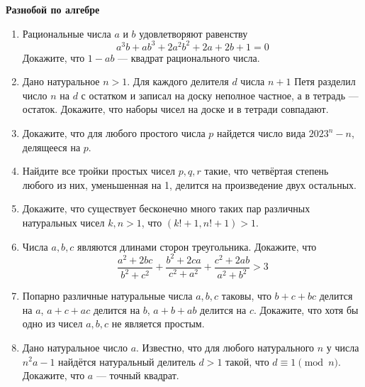 \documentclass{article}
\begin{document}
    \large

    \begin{center}
        \textbf{Разнобой по алгебре}
    \end{center}

    \begin{enumerate}[label*=\protect\fbox{\arabic{enumi}}]

        \item  Рациональные числа $a$ и $b$ удовлетворяют равенству
        \[a^{3}b + ab^3 + 2a^{2}b^2+2a+2b+1 = 0\]
        Докажите, что $1 - ab$ — квадрат рационального числа.

        \item Дано натуральное $n > 1$.
        Для каждого делителя $d$ числа $n + 1$ Петя разделил число $n$ на $d$ с остатком и записал на доску неполное частное, а в тетрадь — остаток.
        Докажите, что наборы чисел на доске и в тетради совпадают.

        \item Докажите, что для любого простого числа $p$ найдется число вида $2023^n - n$,
        делящееся на $p$.

        \item Найдите все тройки простых чисел $p, q, r$ такие, что четвёртая степень любого из них, уменьшенная на 1, делится на произведение двух остальных.

        \item Докажите, что существует бесконечно много таких пар различных натуральных чисел $k, n > 1$, что $(k! + 1, n! + 1) > 1.$

        \item Числа $a, b, c$ являются длинами сторон треугольника.
        Докажите, что \[\frac{a^2 + 2bc}{b^2 + c^2} + \frac{b^2 + 2ca}{c^2 + a^2} +\frac{c^2 + 2ab}{a^2 + b^2} > 3\]

        \item Попарно различные натуральные числа $a, b, c$ таковы, что $b + c + bc$ делится на $a$, $a + c + ac$ делится на $b$, $a + b + ab$ делится на $c$.
        Докажите, что хотя бы одно из чисел $a, b, c$ не является простым.

        \item Дано натуральное число $a$.
        Известно, что для любого натурального $n$ у числа $n^2 a - 1$ найдётся натуральный делитель $d > 1$ такой, что $d \equiv 1 \pmod n$.
        Докажите, что $a$ — точный квадрат.

    \end{enumerate}
\end{document}
